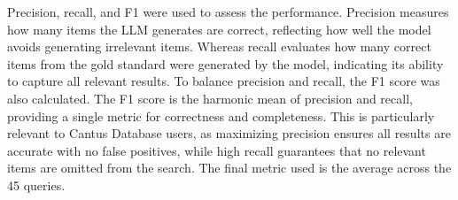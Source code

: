 Precision, recall, and F1 were used to assess the performance. Precision measures how many items the LLM generates are correct, reflecting how well the model avoids generating irrelevant items. Whereas recall evaluates how many correct items from the gold standard were generated by the model, indicating its ability to capture all relevant results. To balance precision and recall, the F1 score was also calculated. The F1 score is the harmonic mean of precision and recall, providing a single metric for correctness and completeness. This is particularly relevant to Cantus Database users, as maximizing precision ensures all results are accurate with no false positives, while high recall guarantees that no relevant items are omitted from the search. The final metric used is the average across the 45 queries.
